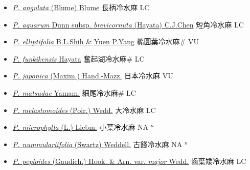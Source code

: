 \begin{itemize}
  \begin{itemize}
        \item[] \href{http://www.theplantlist.org/tpl1.1/search?q=Pilea+angulata}{\textit{P. angulata} (Blume) Blume}   長柄冷水麻 LC
        \item[] \href{http://www.theplantlist.org/tpl1.1/search?q=Pilea+aquarum+subsp.+brevicornuta}{\textit{P. aquarum} Dunn subsp. \textit{brevicornuta} (Hayata) C.J.Chen}   短角冷水麻 LC
        \item[] \href{http://www.theplantlist.org/tpl1.1/search?q=Pilea+elliptifolia}{\textit{P. elliptifolia} B.L.Shih \& Yuen P.Yang}   橢圓葉冷水麻\# VU
        \item[] \href{http://www.theplantlist.org/tpl1.1/search?q=Pilea+funkikensis}{\textit{P. funkikensis} Hayata}   奮起湖冷水麻\# LC
        \item[] \href{http://www.theplantlist.org/tpl1.1/search?q=Pilea+japonica}{\textit{P. japonica} (Maxim.) Hand.-Mazz.}   日本冷水麻 VU
        \item[] \href{http://www.theplantlist.org/tpl1.1/search?q=Pilea+matsudae}{\textit{P. matsudae} Yamam.}   細尾冷水麻\# LC
        \item[] \href{http://www.theplantlist.org/tpl1.1/search?q=Pilea+melastomoides}{\textit{P. melastomoides} (Poir.) Wedd.}   大冷水麻 LC
        \item[] \href{http://www.theplantlist.org/tpl1.1/search?q=Pilea+microphylla}{\textit{P. microphylla} (L.) Liebm.}   小葉冷水麻 NA $^n$
        \item[] \href{http://www.theplantlist.org/tpl1.1/search?q=Pilea+nummulariifolia}{\textit{P. nummulariifolia} (Swartz) Weddell.}   古錢冷水麻 NA $^n$
        \item[] \href{http://www.theplantlist.org/tpl1.1/search?q=Pilea+peploides+var.+major}{\textit{P. peploides} (Gaudich.) Hook. \& Arn. var. \textit{major} Wedd.}   齒葉矮冷水麻 LC

\end{itemize}
\end{itemize}
